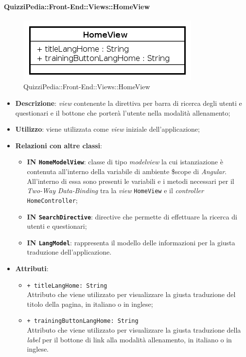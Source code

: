 \paragraph{QuizziPedia::Front-End::Views::HomeView}

\label{QuizziPedia::Front-End::View::HomeView}
\begin{figure} [ht]
	\centering
	\includegraphics[scale=0.80]{UML/Classi/Front-End/QuizziPedia_Front-end_Views_HomeView.png}
	\caption{QuizziPedia::Front-End::Views::HomeView}
\end{figure} \FloatBarrier
\begin{itemize}
	\item \textbf{Descrizione}: \textit{view} contenente la direttiva per barra di ricerca degli utenti e questionari e il bottone che porterà l'utente nella modalità allenamento;
	\item \textbf{Utilizzo}: viene utilizzata come \textit{view} iniziale dell'applicazione;
	\item \textbf{Relazioni con altre classi}:
	\begin{itemize}
		\item \textbf{IN \texttt{HomeModelView}}: classe di tipo \textit{modelview} la cui istanziazione è contenuta all'interno della variabile di ambiente \$scope di \textit{Angular}. All'interno di essa sono presenti le variabili e i metodi necessari per il \textit{Two-Way Data-Binding} tra la \textit{view} \texttt{HomeView} e il \textit{controller} \texttt{HomeController};
		\item \textbf{IN \texttt{SearchDirective}}: directive che permette di effettuare la ricerca di utenti e questionari;
		\item \textbf{IN \texttt{LangModel}}: rappresenta il modello delle informazioni per la giusta traduzione dell'applicazione.
	\end{itemize}
	\item \textbf{Attributi}:
	\begin{itemize}
		\item \texttt{+ titleLangHome: String} \\ Attributo che viene utilizzato per visualizzare la giusta traduzione del titolo della pagina, in italiano o in inglese;
		\item \texttt{+ trainingButtonLangHome: String} \\ Attributo che viene utilizzato per visualizzare la giusta traduzione della \textit{label} per il bottone di link alla modalità allenamento, in italiano o in inglese.
	\end{itemize}
\end{itemize}
	